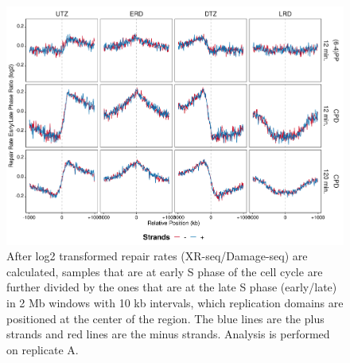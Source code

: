 \begin{figure}[H]
\begin{center}
\includegraphics[width=\textwidth]{Chapters/7_appendix/figures/supfig28}
\caption[Repair rate early/late phase ratio of replication domains in 2 Mb (replicate A).]{After log2 transformed repair rates (XR-seq/Damage-seq) are calculated, samples that are at early S phase of the cell cycle are further divided by the ones that are at the late S phase (early/late) in 2 Mb windows with 10 kb intervals, which replication domains are positioned at the center of the region. The blue lines are the plus strands and red lines are the minus strands. Analysis is performed on replicate A.}
\label{supfig:rrel2000repdomainA}
\end{center}
\end{figure}

